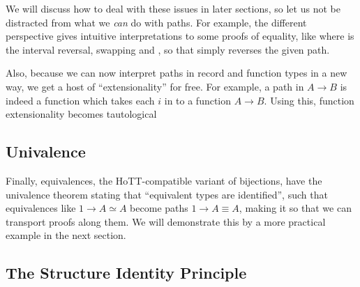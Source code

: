 We will discuss how to deal with these issues in later sections, so let us not be distracted from what we \emph{can} do with paths. For example, the different perspective gives intuitive interpretations to some proofs of equality, like
where  is the interval reversal, swapping  and , so that  simply reverses the given path.

Also, because we can now interpret paths in record and function types in a new way, we get a host of ``extensionality'' for free. For example, a path in $A \to B$ is indeed a function which takes each $i$ in  to a function $A \to B$. Using this, function extensionality becomes tautological 


\subsection{Univalence}
Finally, equivalences, the HoTT-compatible variant of bijections, have the univalence theorem 
stating that ``equivalent types are identified'', such that equivalences like $1 \to A \simeq A$ become paths $1 \to A \equiv A$, making it so that we can transport proofs along them. We will demonstrate this by a more practical example in the next section.


\subsection{The Structure Identity Principle}\label{ssec:leibniz}


